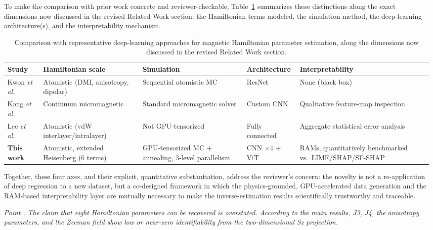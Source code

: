 \documentclass[review,12pt]{report}
\newenvironment{reviewer}{\setcounter{pointcounter}{1}}{}
\newcommand{\point}[1]{\medskip \noindent
 \textsl{{\fontseries{b}\selectfont Point \thepointcounter}.
 \stepcounter{pointcounter} #1}}
\begin{document}
\begin{reviewer}
{To make the comparison with prior work concrete and reviewer-checkable, Table~\ref{tab:novelty_comparison} summarizes these distinctions along the exact dimensions now discussed in the revised Related Work section: the Hamiltonian terms modeled, the simulation method, the deep-learning architecture(s), and the interpretability mechanism.

\begin{table}[h]
\centering
\small
\caption{Comparison with representative deep-learning approaches for magnetic Hamiltonian parameter estimation, along the dimensions now discussed in the revised Related Work section.}
\label{tab:novelty_comparison}
\begin{tabular}{p{1.7cm}p{2.1cm}p{2.2cm}p{2.6cm}p{2.6cm}}
\toprule
\textbf{Study} & \textbf{Hamiltonian scale} & \textbf{Simulation} & \textbf{Architecture} & \textbf{Interpretability} \\
\midrule
Kwon \textit{et al.}~\cite{kwon2020magnetic} & Atomistic (DMI, anisotropy, dipolar) & Sequential atomistic MC & ResNet & None (black box) \\
Kong \textit{et al.}~\cite{kong2023quantifying} & Continuum micromagnetic & Standard micromagnetic solver & Custom CNN & Qualitative feature-map inspection \\
Lee \textit{et al.}~\cite{lee2024deep} & Atomistic (vdW interlayer/intralayer) & Not GPU-tensorized & Fully connected & Aggregate statistical error analysis \\
\textbf{This work} & Atomistic, extended Heisenberg (6 terms) & GPU-tensorized MC + annealing, 3-level parallelism & CNN $\times4$ + ViT & RAMs, quantitatively benchmarked vs.\ LIME/SHAP/SF-SHAP \\
\bottomrule
\end{tabular}
\end{table}

Together, these four axes, and their explicit, quantitative substantiation, address the reviewer's concern: the novelty is not a re-application of deep regression to a new dataset, but a co-designed framework in which the physics-grounded, GPU-accelerated data generation and the RAM-based interpretability layer are mutually necessary to make the inverse-estimation results scientifically trustworthy and traceable.}



\point{The claim that eight Hamiltonian parameters can be recovered is overstated. According to the main results, J3, J4, the anisotropy parameters, and the Zeeman field show low or near-zero identifiability from the two-dimensional Sz projection.}


\end{reviewer}
\end{document}
